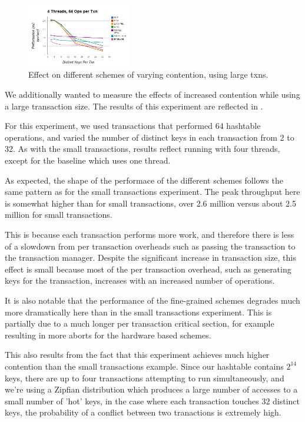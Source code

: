 \begin{figure}[h!]
  \centering
  \includegraphics[width=0.4\textwidth]{figure/large_txns.png}
  \caption{Effect on different schemes of varying contention, using large txns.}
  \label{fig:large_txns} 
\end{figure}

We additionally wanted to measure the effects of increased contention while 
using a large transaction size. The results of this experiment are reflected 
in .

For this experiment, we used transactions that performed 64 hashtable operations, 
and varied the number of distinct keys in each transaction from 2 to 32. As with 
the small transactions, results reflect running with four threads, except for 
the baseline which uses one thread.

As expected, the shape of the performace of the different schemes follows the 
same pattern as for the small transactions experiment. The peak throughput here 
is somewhat higher than for small transactions, over 2.6 million versus about 
2.5 million for small transactions.

This is because each transaction performs more work, and therefore there is less 
of a slowdown from per transaction overheads such as passing the transaction to 
the transaction manager. Despite the significant increase in transaction size, 
this effect is small because most of the per transaction overhead, such as 
generating keys for the transaction, increases with an increased number of 
operations.

It is also notable that the performance of the fine-grained schemes degrades 
much more dramatically here than in the small transactions experiment. This is 
partially due to a much longer per transaction critical section, for example resulting in 
more aborts for the hardware based schemes.

This also results from the fact that this experiment achieves much higher 
contention than the small transactions example. Since our hashtable contains $2^{14}$ 
keys, there are up to four transactions attempting to run simultaneously, and we're using 
a Zipfian distribution which produces a large number of accesses to a small number of 'hot' 
keys, in the case where each transaction touches 32 distinct keys, the probability of a 
conflict between two tranactions is extremely high.

